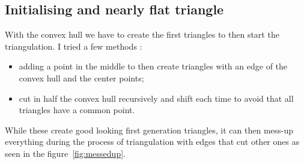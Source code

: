 \documentclass[a4paper,11pt]{article}%
\begin{document}
\subsection{Initialising and nearly flat triangle}
With the convex hull we have to create the first triangles to then start the triangulation. I tried a few methods : 
\begin{itemize}
	\item adding a point in the middle to then create triangles with an edge of the convex hull and the center points;
	\item cut in half the convex hull recursively and shift each time to avoid that all triangles have a common point. 
\end{itemize}

While these create good looking first generation triangles, it can then mess-up everything during the process of triangulation with edges that cut other ones as seen in the figure~\ref{fig:messedup}.
\end{document}
